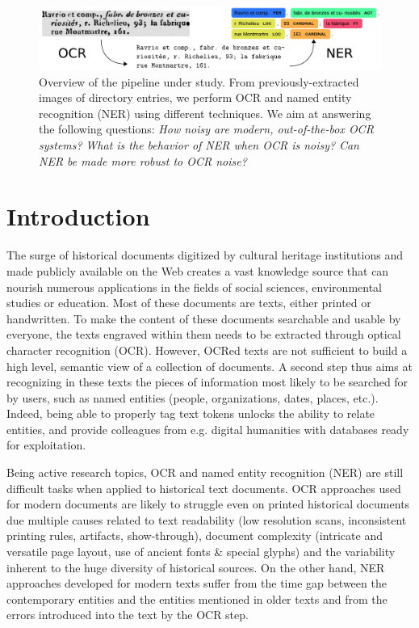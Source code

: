 \begin{figure}[!h]
    \centering
    \includegraphics[width=.9\textwidth]{figs/overview-intro.pdf}
    \caption{%
    Overview of the pipeline under study.
    From previously-extracted images of directory entries, 
    we perform OCR and named entity recognition (NER) using different techniques.
    We aim at answering the following questions:
    \emph{How noisy are modern, out-of-the-box OCR systems?}
    \emph{What is the behavior of NER when OCR is noisy?}
    \emph{Can NER be made more robust to OCR noise?}
    }
    \label{<label>}
\end{figure}
\clearpage%

\section{Introduction}

The surge of historical documents digitized by cultural heritage institutions and made publicly available on the Web creates a vast knowledge source that can nourish numerous applications in the fields of social sciences, environmental studies or education.
Most of these documents are texts, either printed or handwritten.
To make the content of these documents searchable and usable by everyone, the texts engraved within them needs to be extracted through optical character recognition (OCR). 
However, OCRed texts are not sufficient to build a high level, semantic view of a collection of documents. A second step thus aims at recognizing in these texts the pieces of information most likely to be searched for by users, such as named entities (people, organizations, dates, places, etc.). Indeed, being able to properly tag text tokens unlocks the ability to relate entities, and provide colleagues from e.g. digital humanities with databases ready for exploitation.

Being active research topics, OCR and named entity recognition (NER) are still difficult tasks when applied to historical text documents.
OCR approaches used for modern documents are likely to struggle even on printed historical documents due multiple causes related to text readability (low resolution scans, inconsistent printing rules, artifacts, show-through), document complexity (intricate and versatile page layout, use of ancient fonts \& special glyphs) and the variability inherent to the huge diversity of historical sources.
On the other hand, NER approaches developed for modern texts suffer from the time gap between the contemporary entities and the entities mentioned in older texts and from the errors introduced into the text by the OCR step.

